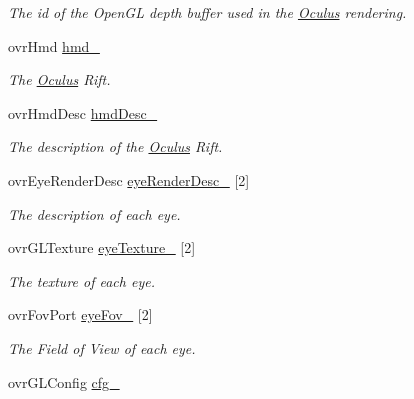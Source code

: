 \begin{DoxyCompactItemize}
\begin{DoxyCompactList}\small\item\em The id of the Open\+G\+L depth buffer used in the \hyperlink{classOculus}{Oculus} rendering. \end{DoxyCompactList}\item 
ovr\+Hmd \hyperlink{classOculus_a27b4553058255871d50e941d67de5374}{hmd\+\_\+}
\begin{DoxyCompactList}\small\item\em The \hyperlink{classOculus}{Oculus} Rift. \end{DoxyCompactList}\item 
ovr\+Hmd\+Desc \hyperlink{classOculus_aaca119fa80d400cb78ce54b69bc39081}{hmd\+Desc\+\_\+}
\begin{DoxyCompactList}\small\item\em The description of the \hyperlink{classOculus}{Oculus} Rift. \end{DoxyCompactList}\item 
ovr\+Eye\+Render\+Desc \hyperlink{classOculus_a6697ef38f95623320ff9e78cc2474567}{eye\+Render\+Desc\+\_\+} \mbox{[}2\mbox{]}
\begin{DoxyCompactList}\small\item\em The description of each eye. \end{DoxyCompactList}\item 
\hypertarget{classOculus_ac041c19b742d76349275583e75dd651a}{}ovr\+G\+L\+Texture \hyperlink{classOculus_ac041c19b742d76349275583e75dd651a}{eye\+Texture\+\_\+} \mbox{[}2\mbox{]}\label{classOculus_ac041c19b742d76349275583e75dd651a}

\begin{DoxyCompactList}\small\item\em The texture of each eye. \end{DoxyCompactList}\item 
\hypertarget{classOculus_a13e8cb827b31c4e96472117488bc04a2}{}ovr\+Fov\+Port \hyperlink{classOculus_a13e8cb827b31c4e96472117488bc04a2}{eye\+Fov\+\_\+} \mbox{[}2\mbox{]}\label{classOculus_a13e8cb827b31c4e96472117488bc04a2}

\begin{DoxyCompactList}\small\item\em The Field of View of each eye. \end{DoxyCompactList}\item 
\hypertarget{classOculus_ab1c10f5b1431c8c13507938e6de46f44}{}ovr\+G\+L\+Config \hyperlink{classOculus_ab1c10f5b1431c8c13507938e6de46f44}{cfg\+\_\+}\label{classOculus_ab1c10f5b1431c8c13507938e6de46f44}


\end{DoxyCompactItemize}
